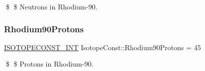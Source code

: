 \$ \$ Neutrons in Rhodium-\/90. \mbox{\label{group___isotope_const-_rhodium-_rh90_ga32972348311f5ee4a71fee2886e77b8e}} 
\subsubsection{\texorpdfstring{Rhodium90\+Protons}{Rhodium90Protons}}
{\footnotesize\ttfamily \mbox{\hyperlink{group___isotope_const-_macros_ga5f18360b3e99483a35c32d789e62621c}{I\+S\+O\+T\+O\+P\+E\+C\+O\+N\+S\+T\+\_\+\+I\+NT}} Isotope\+Const\+::\+Rhodium90\+Protons = 45}

\$ \$ Protons in Rhodium-\/90. 